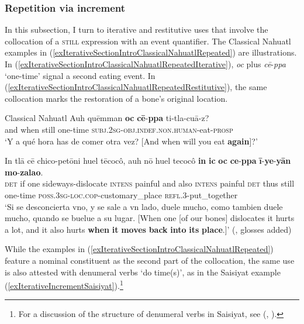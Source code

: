\subsubsection{Repetition via increment}
\label{sectionIterativeViaIncrement}
\largerpage
In this subsection, I turn to iterative and restitutive uses that involve the collocation of a \textsc{still} expression with an event quantifier. The Classical Nahuatl examples in (\ref{exIterativeSectionIntroClassicalNahuatlRepeated}) are illustrations. In (\ref{exIterativeSectionIntroClassicalNahuatlRepeatedIterative}), \textit{oc} plus \textit{cē}-\textit{ppa} \lq one-time' signal a second eating event. In (\ref{exIterativeSectionIntroClassicalNahuatlRepeatedRestitutive}), the same collocation marks the restoration of a bone's original location.
\begin{exe}
	\ex  \label{exIterativeSectionIntroClassicalNahuatlRepeated}
	\begin{xlist}
	\exi{}Classical Nahuatl
	\ex
	\gll Auh quēmman \textbf{oc} \textbf{cē}-\textbf{ppa} ti-tla-cuā-z?\label{exIterativeSectionIntroClassicalNahuatlRepeatedIterative}\\
	and when still one-time \textsc{subj}.2\textsc{sg}-\textsc{obj}.\textsc{indef}.\textsc{non}.\textsc{human}-eat-\textsc{prosp}\\
	\glt \lq Y a qué hora has de comer otra vez? [And when will you eat \textbf{again}]?'

	\ex
\gll In tlā cē chico-petōni huel tēcocô, auh nō huel tecocô \textbf{in} \textbf{ic} \textbf{oc} \textbf{ce}-\textbf{ppa} \textbf{ī}-\textbf{ye}-\textbf{yān} \textbf{mo}-\textbf{zalao}.\label{exIterativeSectionIntroClassicalNahuatlRepeatedRestitutive}\\
\textsc{det} if one sideways-dislocate \textsc{intens} painful and also \textsc{intens} painful \textsc{det} thus still one-time \textsc{poss}.3\textsc{sg}-\textsc{loc}.\textsc{cop}-customary\_place \textsc{refl}.3-put\_together\\
\glt \lq Si se desconcierta vno, y se sale a vn lado, duele mucho, como tambien duele mucho, quando se buelue a su lugar. [When one [of our bones] dislocates it hurts a lot, and it also hurts \textbf{when} \textbf{it} \textbf{moves} \textbf{back} \textbf{into} \textbf{its} \textbf{place}.]' (\cite[498, 505]{Carochi1645},  glosses added)
	\end{xlist}
\end{exe}

While the examples in (\ref{exIterativeSectionIntroClassicalNahuatlRepeated}) feature a nominal constituent as the second part of the collocation, the same use is also attested with denumeral verbs \lq do time(s)\rq{}, as in the Saisiyat example (\ref{exIterativeIncrementSaisiyat}).\footnote{For a discussion of the structure of denumeral verbs in Saisiyat, see \citeauthor{ZeitounEtal2010} (\citeyear[575–577]{ZeitounEtal2010}, \citeyear[522]{ZeitounEtal2015}).}

